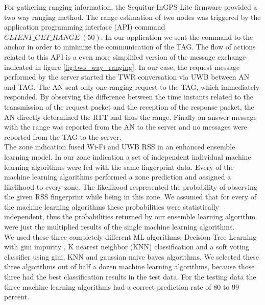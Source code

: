 \noindent\hspace*{5mm}%
For gathering ranging information, the Sequitur InGPS Lite firmware provided a two way ranging method. The range estimation of two nodes was triggered by the application programming interface (API) command $CLIENT\_GET\_RANGE\ (50)$. In our application we sent the command to the anchor in order to minimize the communication of the TAG. The flow of actions related to this API is a even more simplified version of the message exchange indicated in figure \ref{fig:two_way_ranging}. In our case, the request message performed by the server started the TWR conversation via UWB between AN and TAG. The AN sent only one ranging request to the TAG, which immediately responded. By observing the difference between the time instants related to the transmission of the request packet and the reception of the response packet, the AN directly determined the RTT and thus the range. Finally an answer message with the range was reported from the AN to the server and no messages were reported from the TAG to the server.\\
\noindent\hspace*{5mm}%
The zone indication fused Wi-Fi and UWB RSS in an enhanced ensemble learning model. In our zone indication a set of independent individual machine learning algorithms were fed with the same fingerprint data. Every of the machine learning algorithms performed a zone prediction and assigned a likelihood to every zone. The likelihood respresented the probability of observing the given RSS fingerprint while being in this zone. We assumed that for every of the machine learning algorithms these probabilities were statistically independent, thus the probabilities returned by our ensemble learning algorithm were just the multiplied results of the single machine learning algorithms.\\
We used these three completely different ML algorithms: Decision Tree Learning with gini impurity \cite{WikiGini}, K nearest neighbor (KNN) classification \cite{KNN} and a soft voting classifier using gini, KNN and gaussian naive bayes \cite{SKLearn, GaussianNB} algorithms. We selected these three algorithms out of half a dozen machine learning algorithms, because those three had the best classification results in the test data. For the testing data the three machine learning algorithms had a correct prediction rate of 80 to 99 percent. 


